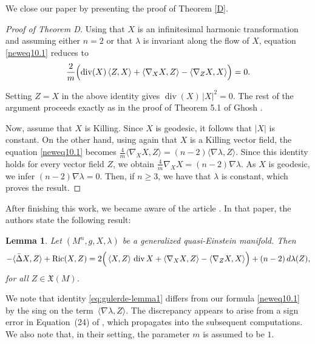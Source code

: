 \documentclass[a4paper, 12pt]{amsart}
\newtheorem{lemma}[theorem]{Lemma}
\theoremstyle{definition}
\numberwithin{figure}{section}
\begin{document}
We close our paper by presenting the proof of Theorem \ref{D}.

\begin{proof}[Proof of Theorem D]
Using that $X$ is an infinitesimal harmonic transformation and assuming either $n=2$ or that $\lambda$ is invariant along the flow of $X$, equation \eqref{neweq10.1} reduces to
\begin{equation*}
\frac{2}{m}\Bigl(
\operatorname{div}(X)\,\langle Z,X\rangle
+\langle \nabla_XX,Z\rangle
-\langle \nabla_ZX,X\rangle
\Bigr)=0.
\end{equation*}

Setting $Z=X$ in the above identity gives
$\operatorname{div}(X)\,|X|^2=0.
$ 
The rest of the argument proceeds exactly as in the proof of Theorem 5.1 of Ghosh \cite{ghosh}.

Now, assume that $X$ is Killing. Since $X$ is geodesic, it follows that $|X|$ is constant. On the other hand, using again that $X$ is a Killing vector field, the equation \eqref{neweq10.1} becomes
$\frac{4}{m}\langle \nabla_XX,Z\rangle
=(n-2)\langle \nabla\lambda,Z\rangle.
$
Since this identity holds for every vector field $Z$, we obtain
$ 
\frac{4}{m}\nabla_XX=(n-2)\nabla\lambda.
$ 
As $X$ is geodesic, we infer
$ 
(n-2)\nabla\lambda=0.
$
Then, if $n\geq 3$, we have that $\lambda$ is constant, which proves the result.
\end{proof}

After finishing this work, we became aware of the article \cite{GulerDe2022}.
In that paper, the authors state the following result:

\begin{lemma}\label{lem:gulerde}
Let $(M^n,g,X,\lambda)$ be a generalized quasi-Einstein manifold. Then
\begin{equation}\label{eq:gulerde-lemma1}
- \langle\bar{\Delta} X, Z\rangle + \operatorname{Ric}(X, Z)
= 2\Bigl(\, \langle X, Z\rangle\, \operatorname{div} X
+ \langle\nabla_X X, Z\rangle
- \langle\nabla_Z X, X \rangle\Bigr)
+ (n - 2)\, d\lambda(Z),
\end{equation}
for all $Z \in \mathfrak{X}(M)$.
\end{lemma}
We note that identity \eqref{eq:gulerde-lemma1} differs from our formula
\eqref{neweq10.1} by the sing on the term $\, \langle\nabla \lambda, Z\rangle$.
The discrepancy appears to arise from a sign error
in Equation~(24) of \cite{GulerDe2022}, which propagates into the subsequent computations. We also note that, in their setting, the parameter \(m\) is assumed to be \(1\).
\end{document}
